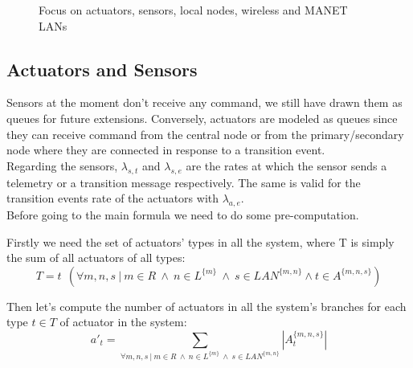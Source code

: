 \documentclass[11pt]{article}
\begin{document}
\begin{figure}[H]
	\centering
	\frame{}
	\caption{Focus on actuators, sensors,  local nodes, wireless and MANET LANs}
\end{figure}

\subsection{Actuators and Sensors}
Sensors at the moment don't receive any command, we still have drawn them as queues for future extensions. Conversely, actuators are modeled as queues since they can receive command from the central node or from the primary/secondary node where they are connected in response to a transition event.\\
Regarding the sensors, $\lambda_{s,t}$ and $\lambda_{s,e}$ are the rates at which the sensor sends a telemetry or a transition message respectively. The same is valid for the transition events rate of the actuators with $\lambda_{a,e}$.\\

Before going to the main formula we need to do some pre-computation.


Firstly we need the set of actuators' types in all the system, where T is simply the sum of all actuators of all types:
\begin{equation}
    T = t \  \ (\forall m,n,s \ | \ m \in R \ \land \ n \in L^{\{m\}} \ \land \ s \in LAN^{\{m, n\}} \land t \in A^{\{m,n,s\}})
\end{equation}

Then let's compute the number of actuators in all the system's branches for each type $t \in T$ of actuator in the system:
\begin{equation}
    a'_{t} = \sum_{\forall m,n,s \ | \ m \in R \ \land \ n \in L^{\{m\}} \ \land \ s \in LAN^{\{m, n\}}}{ |A^{\{m, n, s\}}_{t}| }
\end{equation}
\end{document}
